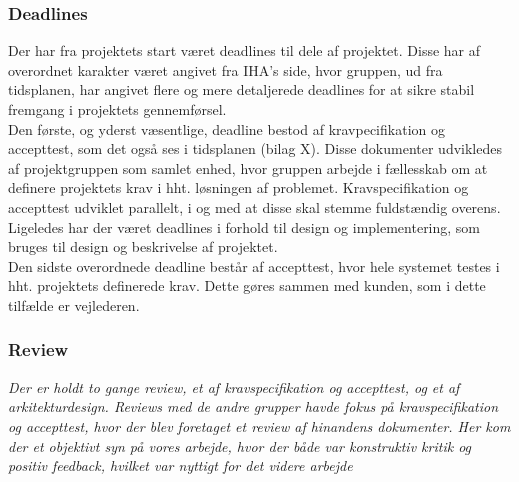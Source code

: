 \subsubsection{Deadlines}
Der har fra projektets start været deadlines til dele af projektet. Disse har af overordnet karakter været angivet fra IHA's side, hvor gruppen, ud fra tidsplanen, har angivet flere og mere detaljerede deadlines for at sikre stabil fremgang i projektets gennemførsel. \\
Den første, og yderst væsentlige, deadline bestod af kravpecifikation og accepttest, som det også ses i tidsplanen (bilag X). Disse dokumenter udvikledes af projektgruppen som samlet enhed, hvor gruppen arbejde i fællesskab om at definere projektets krav i hht. løsningen af problemet. Kravspecifikation og accepttest udviklet parallelt, i og med at disse skal stemme fuldstændig overens. \\
\newline
Ligeledes har der været deadlines i forhold til design og implementering, som bruges til design og beskrivelse af projektet.\\
\newline
Den sidste overordnede deadline består af accepttest, hvor hele systemet testes i hht. projektets definerede krav. Dette gøres sammen med kunden, som i dette tilfælde er vejlederen. 


\subsubsection{Review}

\textit{Der er holdt to gange review, et af kravspecifikation og accepttest, og et af arkitekturdesign. 
Reviews med de andre grupper havde fokus på kravspecifikation og accepttest, hvor der blev foretaget et review af hinandens dokumenter. Her kom der et objektivt syn på vores arbejde, hvor der både var konstruktiv kritik og positiv feedback, hvilket var nyttigt for det videre arbejde}

